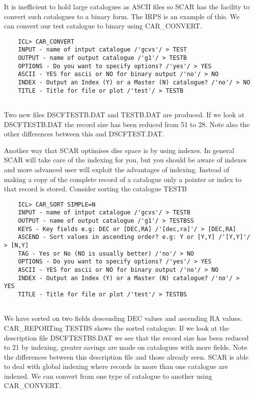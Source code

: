It is inefficient to hold large catalogues as ASCII files so SCAR has the 
facility to convert such catalogues to a binary form. The IRPS is an example 
of this. We can convert our test catalogue to binary using CAR\_CONVERT.
  

\begin{verbatim}
    ICL> CAR_CONVERT
    INPUT - name of intput catalogue /'gcvs'/ > TEST
    OUTPUT - name of output catalogue /'g1'/ > TESTB
    OPTIONS - Do you want to specify options? /'yes'/ > YES
    ASCII - YES for ascii or NO for binary output /'no'/ > NO
    INDEX - Output an Index (Y) or a Master (N) catalogue? /'no'/ > NO
    TITLE - Title for file or plot /'test'/ > TESTB
    
\end{verbatim}

Two new files DSCFTESTB.DAT and TESTB.DAT are produced. If we look at 
DSCFTESTB.DAT the record size has been reduced from 51 to 28. Note also the 
other differences between this and DSCFTEST.DAT.

Another way that SCAR optimises disc space is by using indexes. In general 
SCAR will take care of the indexing for you, but you should be aware of indexes
and more advanced user will exploit the advantages of indexing.
Instead of making a copy of the complete record 
of a catalogue only a pointer or index to that record is stored. Consider 
sorting the catalogue TESTB


\begin{verbatim}
    ICL> CAR_SORT SIMPLE=N
    INPUT - name of intput catalogue /'gcvs'/ > TESTB
    OUTPUT - name of output catalogue /'g1'/ > TESTBSS
    KEYS - Key fields e.g: DEC or [DEC,RA] /'[dec,ra]'/ > [DEC,RA]
    ASCEND - Sort values in ascending order? e.g: Y or [Y,Y] /'[Y,Y]'/ > [N,Y]
    TAG - Yes or No (NO is usually better) /'no'/ > NO
    OPTIONS - Do you want to specify options? /'yes'/ > YES
    ASCII - YES for ascii or NO for binary output /'no'/ > NO
    INDEX - Output an Index (Y) or a Master (N) catalogue? /'no'/ > YES
    TITLE - Title for file or plot /'test'/ > TESTBS
    
\end{verbatim}

We have sorted on two fields descending DEC values and ascending RA values.
CAR\_REPORTing TESTBS shows the sorted catalogue. If we look at the description 
file DSCFTESTBS.DAT we see that the record size has been reduced to 21 by
indexing, greater
savings are made on catalogues with more fields. Note the differences between 
this description file and those already seen. SCAR is able to deal with global 
indexing where records in more than one catalogue are indexed. 
We can convert from one type of catalogue 
to another using CAR\_CONVERT. 


